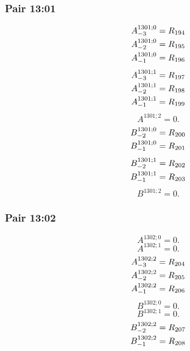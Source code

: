 \documentclass[11pt,a4paper]{article}
\begin{document}
\subsubsection{Pair 13:01}
\begin{equation}
\shortstack[l]{$\displaystyle A^{1301;0}_{-3}=R_{194}$\\
$\displaystyle A^{1301;0}_{-2}=R_{195}$\\
$\displaystyle A^{1301;0}_{-1}=R_{196}$}
\label{eq:cat-map-330}
\end{equation}
\begin{equation}
\shortstack[l]{$\displaystyle A^{1301;1}_{-3}=R_{197}$\\
$\displaystyle A^{1301;1}_{-2}=R_{198}$\\
$\displaystyle A^{1301;1}_{-1}=R_{199}$}
\label{eq:cat-map-331}
\end{equation}
\begin{equation}
A^{1301;2}=0.
\label{eq:cat-map-332}
\end{equation}
\begin{equation}
\shortstack[l]{$\displaystyle B^{1301;0}_{-2}=R_{200}$\\
$\displaystyle B^{1301;0}_{-1}=R_{201}$}
\label{eq:cat-map-333}
\end{equation}
\begin{equation}
\shortstack[l]{$\displaystyle B^{1301;1}_{-2}=R_{202}$\\
$\displaystyle B^{1301;1}_{-1}=R_{203}$}
\label{eq:cat-map-334}
\end{equation}
\begin{equation}
B^{1301;2}=0.
\label{eq:cat-map-335}
\end{equation}
\subsubsection{Pair 13:02}
\begin{equation}
A^{1302;0}=0.
\label{eq:cat-map-336}
\end{equation}
\begin{equation}
A^{1302;1}=0.
\label{eq:cat-map-337}
\end{equation}
\begin{equation}
\shortstack[l]{$\displaystyle A^{1302;2}_{-3}=R_{204}$\\
$\displaystyle A^{1302;2}_{-2}=R_{205}$\\
$\displaystyle A^{1302;2}_{-1}=R_{206}$}
\label{eq:cat-map-338}
\end{equation}
\begin{equation}
B^{1302;0}=0.
\label{eq:cat-map-339}
\end{equation}
\begin{equation}
B^{1302;1}=0.
\label{eq:cat-map-340}
\end{equation}
\begin{equation}
\shortstack[l]{$\displaystyle B^{1302;2}_{-2}=R_{207}$\\
$\displaystyle B^{1302;2}_{-1}=R_{208}$}
\label{eq:cat-map-341}
\end{equation}
\end{document}
